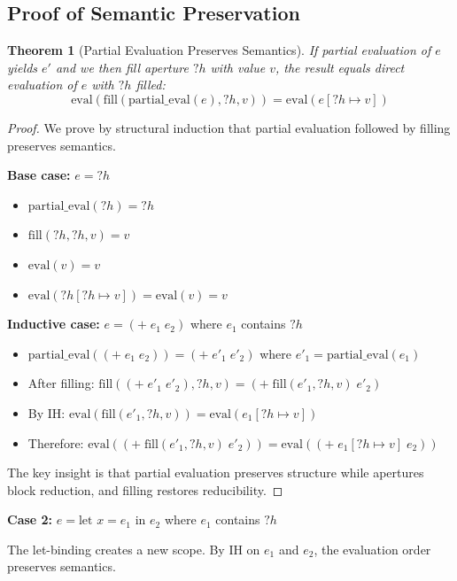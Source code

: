 \documentclass[12pt]{article}
\newtheorem{theorem}{Theorem}
\begin{document}
\subsection{Proof of Semantic Preservation}

\begin{theorem}[Partial Evaluation Preserves Semantics]
If partial evaluation of $e$ yields $e'$ and we then fill aperture $?h$ with value $v$, the result equals direct evaluation of $e$ with $?h$ filled:
$$\text{eval}(\text{fill}(\text{partial\_eval}(e), ?h, v)) = \text{eval}(e[?h \mapsto v])$$
\end{theorem}

\begin{proof}
We prove by structural induction that partial evaluation followed by filling preserves semantics.

\textbf{Base case:} $e = ?h$
\begin{itemize}
    \item $\text{partial\_eval}(?h) = ?h$
    \item $\text{fill}(?h, ?h, v) = v$
    \item $\text{eval}(v) = v$
    \item $\text{eval}(?h[?h \mapsto v]) = \text{eval}(v) = v$ \checkmark
\end{itemize}

\textbf{Inductive case:} $e = (+ \; e_1 \; e_2)$ where $e_1$ contains $?h$
\begin{itemize}
    \item $\text{partial\_eval}((+ \; e_1 \; e_2)) = (+ \; e'_1 \; e'_2)$ where $e'_1 = \text{partial\_eval}(e_1)$
    \item After filling: $\text{fill}((+ \; e'_1 \; e'_2), ?h, v) = (+ \; \text{fill}(e'_1, ?h, v) \; e'_2)$
    \item By IH: $\text{eval}(\text{fill}(e'_1, ?h, v)) = \text{eval}(e_1[?h \mapsto v])$
    \item Therefore: $\text{eval}((+ \; \text{fill}(e'_1, ?h, v) \; e'_2)) = \text{eval}((+ \; e_1[?h \mapsto v] \; e_2))$
\end{itemize}

The key insight is that partial evaluation preserves structure while apertures block reduction, and filling restores reducibility.
\end{proof}

\textbf{Case 2:} $e = \text{let } x = e_1 \text{ in } e_2$ where $e_1$ contains $?h$

The let-binding creates a new scope. By IH on $e_1$ and $e_2$, the evaluation order preserves semantics.
\end{document}

